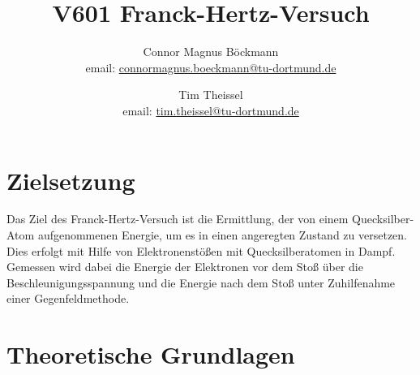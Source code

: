 \documentclass[titlepage=firstcover, captions=tableheading]{scrartcl}
\title{V601 Franck-Hertz-Versuch}
\author{
Connor Magnus Böckmann \\ email: \href{mailto:connormagnus.boeckmann@tu-dortmund.de}{connormagnus.boeckmann@tu-dortmund.de}
\and Tim Theissel \\ email: \href{mailto:tim.theissel@tu-dortmund.de}{tim.theissel@tu-dortmund.de}}
\begin{document}
\maketitle
\newpage
\tableofcontents
\newpage
\section{Zielsetzung}
Das Ziel des Franck-Hertz-Versuch ist die Ermittlung, der von einem Quecksilber-Atom aufgenommenen Energie, um es in einen angeregten Zustand zu versetzen. Dies erfolgt mit Hilfe von Elektronenstößen mit Quecksilberatomen in Dampf. Gemessen wird dabei die Energie der Elektronen vor dem Stoß über die Beschleunigungsspannung und die Energie nach dem Stoß unter Zuhilfenahme einer Gegenfeldmethode. 
\section{Theoretische Grundlagen}
\end{document}
